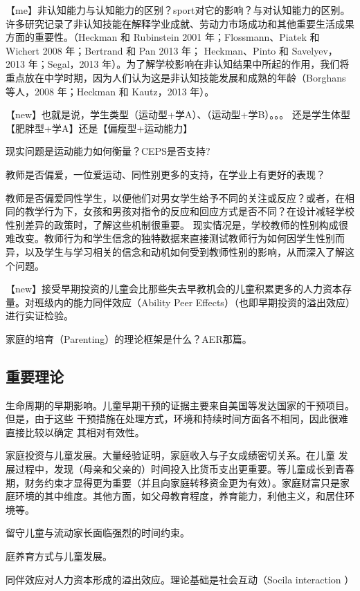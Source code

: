 【me】非认知能力与认知能力的区别？sport对它的影响？与对认知能力的区别。
许多研究记录了非认知技能在解释学业成就、劳动力市场成功和其他重要生活成果方面的重要性。（Heckman 和 Rubinstein 2001 年；Flossmann、Piatek 和 Wichert 2008 年；Bertrand 和 Pan 2013 年； Heckman、Pinto 和 Savelyev，2013 年；Segal，2013 年）。为了解学校影响在非认知结果中所起的作用，我们将重点放在中学时期，因为人们认为这是非认知技能发展和成熟的年龄（Borghans 等人，2008 年；Heckman 和 Kautz，2013 年）。

【new】也就是说，学生类型（运动型+学A）、（运动型+学B）。。。
还是学生体型【肥胖型+学A】还是【偏瘦型+运动能力】

现实问题是运动能力如何衡量？CEPS是否支持?

教师是否偏爱，一位爱运动、同性别更多的支持，在学业上有更好的表现？

教师是否偏爱同性学生，以便他们对男女学生给予不同的关注或反应？或者，在相同的教学行为下，女孩和男孩对指令的反应和回应方式是否不同？在设计减轻学校性别差异的政策时，了解这些机制很重要。
现实情况是，学校教师的性别构成很难改变。教师行为和学生信念的独特数据来直接测试教师行为如何因学生性别而异，以及学生与学习相关的信念和动机如何受到教师性别的影响，从而深入了解这个问题。



【new】接受早期投资的儿童会比那些失去早教机会的儿童积累更多的人力资本存量。对班级内的能力同伴效应（Ability Peer Effects）（也即早期投资的溢出效应）进行实证检验。

家庭的培育（Parenting）的理论框架是什么？AER那篇。

\subsection{重要理论}

生命周期的早期影响。儿童早期干预的证据主要来自美国等发达国家的干预项目。但是，由于这些 干预措施在处理方式，环境和持续时间方面各不相同，因此很难直接比较以确定 其相对有效性。

家庭投资与儿童发展。大量经验证明，家庭收入与子女成绩密切关系。在儿童 发展过程中，发现（母亲和父亲的）时间投入比货币支出更重要。等儿童成长到青春期，财务约束才显得更为重要（并且向家庭转移资金更为有效）。家庭财富只是家庭环境的其中维度。其他方面，如父母教育程度，养育能力，利他主义，和居住环境等。

留守儿童与流动家长面临强烈的时间约束。

庭养育方式与儿童发展。

同伴效应对人力资本形成的溢出效应。理论基础是社会互动（Socila interaction ）

